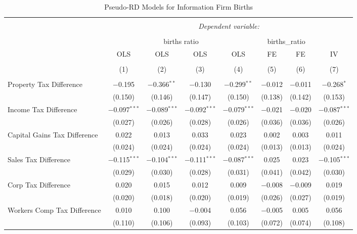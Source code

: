 
\begin{table}[!htbp] \centering 
  \caption{Pseudo-RD Models for  Information Firm Births} 
  \label{} 
\begin{tabular}{@{\extracolsep{5pt}}lccccccc} 
\\[-1.8ex]\hline 
\hline \\[-1.8ex] 
 & \multicolumn{7}{c}{\textit{Dependent variable:}} \\ 
\cline{2-8} 
\\[-1.8ex] & \multicolumn{4}{c}{births ratio} & \multicolumn{2}{c}{births\_ratio} &   \\ 
 & OLS & OLS & OLS & OLS & FE & FE & IV \\ 
\\[-1.8ex] & (1) & (2) & (3) & (4) & (5) & (6) & (7)\\ 
\hline \\[-1.8ex] 
 Property Tax Difference & $-$0.195 & $-$0.366$^{**}$ & $-$0.130 & $-$0.299$^{**}$ & $-$0.012 & $-$0.011 & $-$0.268$^{*}$ \\ 
  & (0.150) & (0.146) & (0.147) & (0.150) & (0.138) & (0.142) & (0.153) \\ 
  Income Tax Difference & $-$0.097$^{***}$ & $-$0.089$^{***}$ & $-$0.092$^{***}$ & $-$0.079$^{***}$ & $-$0.021 & $-$0.020 & $-$0.087$^{***}$ \\ 
  & (0.027) & (0.026) & (0.028) & (0.026) & (0.036) & (0.036) & (0.026) \\ 
  Capital Gains Tax Difference & 0.022 & 0.013 & 0.033 & 0.023 & 0.002 & 0.003 & 0.011 \\ 
  & (0.024) & (0.024) & (0.024) & (0.024) & (0.013) & (0.013) & (0.024) \\ 
  Sales Tax Difference & $-$0.115$^{***}$ & $-$0.104$^{***}$ & $-$0.111$^{***}$ & $-$0.087$^{***}$ & 0.025 & 0.023 & $-$0.105$^{***}$ \\ 
  & (0.029) & (0.030) & (0.028) & (0.031) & (0.041) & (0.042) & (0.030) \\ 
  Corp Tax Difference & 0.020 & 0.015 & 0.012 & 0.009 & $-$0.008 & $-$0.009 & 0.019 \\ 
  & (0.020) & (0.018) & (0.020) & (0.019) & (0.026) & (0.027) & (0.019) \\ 
  Workers Comp Tax Difference & 0.010 & 0.100 & $-$0.004 & 0.056 & $-$0.005 & 0.005 & 0.056 \\ 
  & (0.110) & (0.106) & (0.093) & (0.103) & (0.072) & (0.074) & (0.108) \\ 

\end{tabular}
\end{table}

